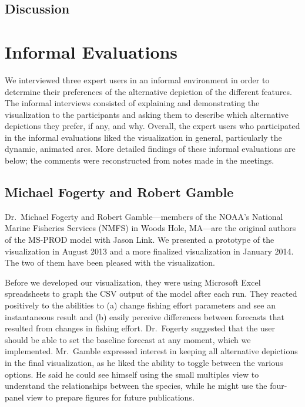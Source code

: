 \subsection{Discussion}


\section{Informal Evaluations}

We interviewed three expert users in an informal environment in order to determine their preferences of the alternative depiction of the different features.  The informal interviews consisted of explaining and demonstrating the visualization to the participants and asking them to describe which alternative depictions they prefer, if any, and why.  Overall, the expert users who participated in the informal evaluations liked the visualization in general, particularly the dynamic, animated arcs.  More detailed findings of these informal evaluations are below; the comments were reconstructed from notes made in the meetings.

\subsection{Michael Fogerty and Robert Gamble} %

Dr.\ Michael Fogerty and Robert Gamble---members of the NOAA's National Marine Fisheries Services (NMFS) in Woods Hole, MA---are the original authors of the MS-PROD model with Jason Link.  We presented a prototype of the visualization in August 2013 and a more finalized visualization in January 2014.  The two of them have been pleased with the visualization.

Before we developed our visualization, they were using Microsoft Excel spreadsheets to graph the CSV output of the model after each run.  They reacted positively to the abilities to (a) change fishing effort parameters and see an instantaneous result and (b) easily perceive differences between forecasts that resulted from changes in fishing effort.  Dr.\ Fogerty suggested that the user should be able to set the baseline forecast at any moment, which we implemented.  Mr.\ Gamble expressed interest in keeping all alternative depictions in the final visualization, as he liked the ability to toggle between the various options.  He said he could see himself using the small multiples view to understand the relationships between the species, while he might use the four-panel view to prepare figures for future publications.

